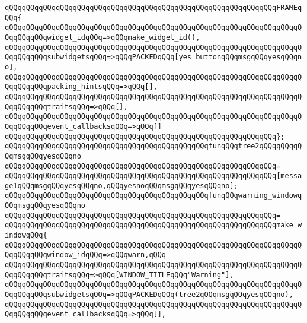 \verb|qQQqqQQqqQQqqQQqqQQqqQQqqQQqqQQqqQQqqQQqqQQqqQQqqQQqqQQqqQQqqQQqFRAMEqQQq{|\newline
\verb|qQQqqQQqqQQqqQQqqQQqqQQqqQQqqQQqqQQqqQQqqQQqqQQqqQQqqQQqqQQqqQQqqQQqqQQqqQQqqQQqwidget_idqQQq=>qQQqmake_widget_id(),|\newline
\verb|qQQqqQQqqQQqqQQqqQQqqQQqqQQqqQQqqQQqqQQqqQQqqQQqqQQqqQQqqQQqqQQqqQQqqQQqqQQqqQQqsubwidgetsqQQq=>qQQqPACKEDqQQq[yes_buttonqQQqmsgqQQqyesqQQqno],|\newline
\verb|qQQqqQQqqQQqqQQqqQQqqQQqqQQqqQQqqQQqqQQqqQQqqQQqqQQqqQQqqQQqqQQqqQQqqQQqqQQqqQQqpacking_hintsqQQq=>qQQq[],|\newline
\verb|qQQqqQQqqQQqqQQqqQQqqQQqqQQqqQQqqQQqqQQqqQQqqQQqqQQqqQQqqQQqqQQqqQQqqQQqqQQqqQQqtraitsqQQq=>qQQq[],|\newline
\verb|qQQqqQQqqQQqqQQqqQQqqQQqqQQqqQQqqQQqqQQqqQQqqQQqqQQqqQQqqQQqqQQqqQQqqQQqqQQqqQQqevent_callbacksqQQq=>qQQq[]|\newline
\verb|qQQqqQQqqQQqqQQqqQQqqQQqqQQqqQQqqQQqqQQqqQQqqQQqqQQqqQQqqQQqqQQq};|\newline
\newline
\verb|qQQqqQQqqQQqqQQqqQQqqQQqqQQqqQQqqQQqqQQqqQQqqQQqfunqQQqtree2qQQqqQQqqQQqmsgqQQqyesqQQqno|\newline
\verb|qQQqqQQqqQQqqQQqqQQqqQQqqQQqqQQqqQQqqQQqqQQqqQQqqQQqqQQqqQQqqQQq=|\newline
\verb|qQQqqQQqqQQqqQQqqQQqqQQqqQQqqQQqqQQqqQQqqQQqqQQqqQQqqQQqqQQqqQQq[message1qQQqmsgqQQqyesqQQqno,qQQqyesnoqQQqmsgqQQqyesqQQqno];|\newline
\newline
\verb|qQQqqQQqqQQqqQQqqQQqqQQqqQQqqQQqqQQqqQQqqQQqqQQqfunqQQqwarning_windowqQQqmsgqQQqyesqQQqno|\newline
\verb|qQQqqQQqqQQqqQQqqQQqqQQqqQQqqQQqqQQqqQQqqQQqqQQqqQQqqQQqqQQqqQQq=|\newline
\verb|qQQqqQQqqQQqqQQqqQQqqQQqqQQqqQQqqQQqqQQqqQQqqQQqqQQqqQQqqQQqqQQqmake_windowqQQq{|\newline
\verb|qQQqqQQqqQQqqQQqqQQqqQQqqQQqqQQqqQQqqQQqqQQqqQQqqQQqqQQqqQQqqQQqqQQqqQQqqQQqqQQqwindow_idqQQq=>qQQqwarn,qQQq|\newline
\verb|qQQqqQQqqQQqqQQqqQQqqQQqqQQqqQQqqQQqqQQqqQQqqQQqqQQqqQQqqQQqqQQqqQQqqQQqqQQqqQQqtraitsqQQq=>qQQq[WINDOW_TITLEqQQq"Warning"],|\newline
\verb|qQQqqQQqqQQqqQQqqQQqqQQqqQQqqQQqqQQqqQQqqQQqqQQqqQQqqQQqqQQqqQQqqQQqqQQqqQQqqQQqsubwidgetsqQQq=>qQQqPACKEDqQQq(tree2qQQqmsgqQQqyesqQQqno),|\newline
\verb|qQQqqQQqqQQqqQQqqQQqqQQqqQQqqQQqqQQqqQQqqQQqqQQqqQQqqQQqqQQqqQQqqQQqqQQqqQQqqQQqevent_callbacksqQQq=>qQQq[],|\newline
